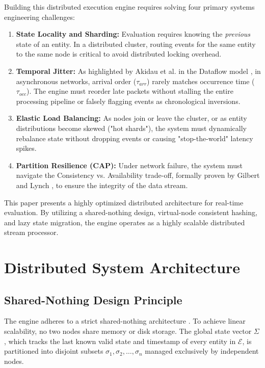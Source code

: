 \documentclass[conference]{IEEEtran}
\begin{document}
Building this distributed execution engine requires solving four primary systems engineering challenges:
\begin{enumerate}
    \item \textbf{State Locality and Sharding:} Evaluation requires knowing the \textit{previous} state of an entity. In a distributed cluster, routing events for the same entity to the same node is critical to avoid distributed locking overhead.
    \item \textbf{Temporal Jitter:} As highlighted by Akidau et al. in the Dataflow model \cite{b17}, in asynchronous networks, arrival order ($\tau_{arr}$) rarely matches occurrence time ($\tau_{occ}$). The engine must reorder late packets without stalling the entire processing pipeline or falsely flagging events as chronological inversions.
    \item \textbf{Elastic Load Balancing:} As nodes join or leave the cluster, or as entity distributions become skewed ("hot shards"), the system must dynamically rebalance state without dropping events or causing "stop-the-world" latency spikes.
    \item \textbf{Partition Resilience (CAP):} Under network failure, the system must navigate the Consistency vs. Availability trade-off, formally proven by Gilbert and Lynch \cite{b19}, to ensure the integrity of the data stream.
\end{enumerate}

This paper presents a highly optimized distributed architecture for real-time evaluation. By utilizing a shared-nothing design, virtual-node consistent hashing, and lazy state migration, the engine operates as a highly scalable distributed stream processor.

\section{Distributed System Architecture}


\subsection{Shared-Nothing Design Principle}
The engine adheres to a strict shared-nothing architecture \cite{b2}. To achieve linear scalability, no two nodes share memory or disk storage. The global state vector $\Sigma$, which tracks the last known valid state and timestamp of every entity in $\mathcal{E}$, is partitioned into disjoint subsets $\sigma_1, \sigma_2, \dots, \sigma_n$ managed exclusively by independent nodes.
\end{document}
